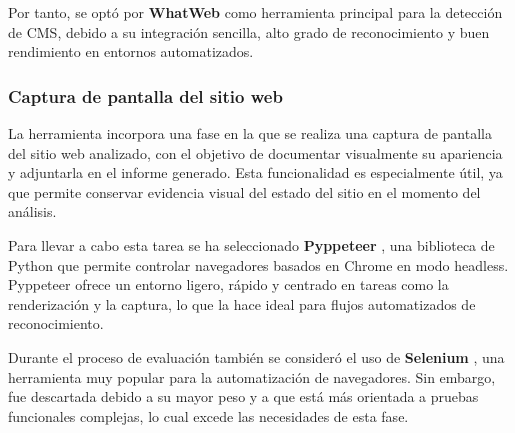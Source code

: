 \begin{parskipenv}
\begin{table}[H]
\centering
\renewcommand{\arraystretch}{1.4}
\caption{Comparativa de herramientas para la detección de CMS.}
\label{tabla:comparativa_cms}
\end{table}

Por tanto, se optó por \textbf{WhatWeb} como herramienta principal para la detección de CMS, debido a su integración sencilla, alto grado de reconocimiento y buen rendimiento en entornos automatizados.

\subsubsection*{Captura de pantalla del sitio web}
La herramienta incorpora una fase en la que se realiza una captura de pantalla del sitio web analizado, con el objetivo de documentar visualmente su apariencia y adjuntarla en el informe generado. Esta funcionalidad es especialmente útil, ya que permite conservar evidencia visual del estado del sitio en el momento del análisis.

Para llevar a cabo esta tarea se ha seleccionado \textbf{Pyppeteer} \cite{pyppeteer}, una biblioteca de Python que permite controlar navegadores basados en Chrome en modo headless. Pyppeteer ofrece un entorno ligero, rápido y centrado en tareas como la renderización y la captura, lo que la hace ideal para flujos automatizados de reconocimiento.

Durante el proceso de evaluación también se consideró el uso de \textbf{Selenium} \cite{selenium}, una herramienta muy popular para la automatización de navegadores. Sin embargo, fue descartada debido a su mayor peso y a que está más orientada a pruebas funcionales complejas, lo cual excede las necesidades de esta fase.


\end{parskipenv}
